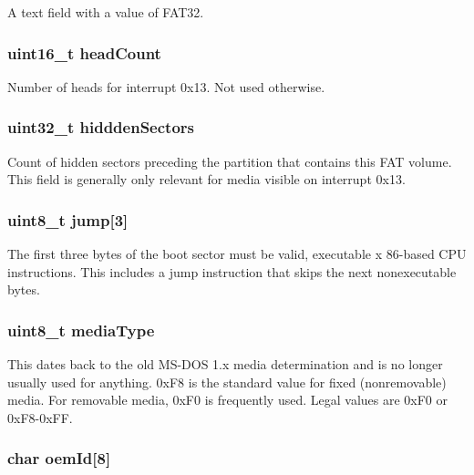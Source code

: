 A text field with a value of F\-A\-T32. \hypertarget{structfat32__boot_a57cb7e16b9969fa87c9f1ca43a87d217}{
\subsubsection[{head\-Count}]{\setlength{\rightskip}{0pt plus 5cm}uint16\-\_\-t head\-Count}}\label{structfat32__boot_a57cb7e16b9969fa87c9f1ca43a87d217}
Number of heads for interrupt 0x13. Not used otherwise. \hypertarget{structfat32__boot_a454fd6cc3f063c86b7fe65c367da7cdd}{
\subsubsection[{hiddden\-Sectors}]{\setlength{\rightskip}{0pt plus 5cm}uint32\-\_\-t hiddden\-Sectors}}\label{structfat32__boot_a454fd6cc3f063c86b7fe65c367da7cdd}
Count of hidden sectors preceding the partition that contains this F\-A\-T volume. This field is generally only relevant for media visible on interrupt 0x13. \hypertarget{structfat32__boot_a61b95cffdd449d10352cfd0288b23287}{
\subsubsection[{jump}]{\setlength{\rightskip}{0pt plus 5cm}uint8\-\_\-t jump\mbox{[}3\mbox{]}}}\label{structfat32__boot_a61b95cffdd449d10352cfd0288b23287}
The first three bytes of the boot sector must be valid, executable x 86-\/based C\-P\-U instructions. This includes a jump instruction that skips the next nonexecutable bytes. \hypertarget{structfat32__boot_ab88738f9cb91c882cb91d5e83a19a73f}{
\subsubsection[{media\-Type}]{\setlength{\rightskip}{0pt plus 5cm}uint8\-\_\-t media\-Type}}\label{structfat32__boot_ab88738f9cb91c882cb91d5e83a19a73f}
This dates back to the old M\-S-\/\-D\-O\-S 1.\-x media determination and is no longer usually used for anything. 0x\-F8 is the standard value for fixed (nonremovable) media. For removable media, 0x\-F0 is frequently used. Legal values are 0x\-F0 or 0x\-F8-\/0x\-F\-F. \hypertarget{structfat32__boot_adff248465625d1fa3583bfcf2838620d}{
\subsubsection[{oem\-Id}]{\setlength{\rightskip}{0pt plus 5cm}char oem\-Id\mbox{[}8\mbox{]}}}\label{structfat32__boot_adff248465625d1fa3583bfcf2838620d}
